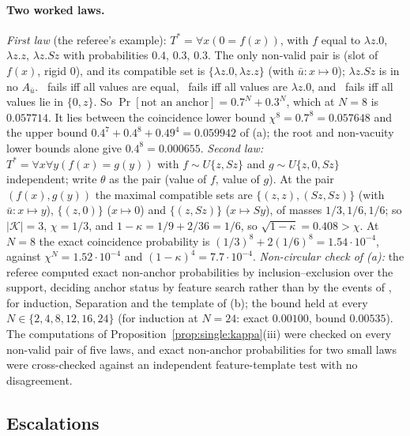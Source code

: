 \paragraph{Two worked laws.} \emph{First law} (the referee's example): $T^*=\forall x(0=f(x))$, with $f$ equal to $\lambda z.0$, $\lambda z.z$, $\lambda z.Sz$ with probabilities $0.4$, $0.3$, $0.3$. The only non-valid pair is (slot of $f(x)$, rigid $0$), and its compatible set is $\{\lambda z.0,\lambda z.z\}$ (with $\bar u:x\mapsto0$); $\lambda z.Sz$ is in no $A_{\bar u}$. \evRs\ fails iff all values are equal, \evN\ fails iff all values are $\lambda z.0$, and \evU\ fails iff all values lie in $\{0,z\}$. So $\Pr[\text{not an anchor}]=0.7^N+0.3^N$, which at $N=8$ is $0.057714$. It lies between the coincidence lower bound $\chi^8=0.7^8=0.057648$ and the upper bound $0.4^7+0.4^8+0.49^4=0.059942$ of (a); the root and non-vacuity lower bounds alone give $0.4^8=0.000655$. \emph{Second law:} $T^*=\forall x\forall y(f(x)=g(y))$ with $f\sim U\{z,Sz\}$ and $g\sim U\{z,0,Sz\}$ independent; write $\theta$ as the pair (value of $f$, value of $g$). At the pair $(f(x),g(y))$ the maximal compatible sets are $\{(z,z),(Sz,Sz)\}$ (with $\bar u:x\mapsto y$), $\{(z,0)\}$ ($x\mapsto0$) and $\{(z,Sz)\}$ ($x\mapsto Sy$), of masses $1/3,1/6,1/6$; so $|\mathcal K|=3$, $\chi=1/3$, and $1-\kappa=1/9+2/36=1/6$, so $\sqrt{1-\kappa}=0.408>\chi$. At $N=8$ the exact coincidence probability is $(1/3)^8+2(1/6)^8=1.54\cdot10^{-4}$, against $\chi^N=1.52\cdot10^{-4}$ and $(1-\kappa)^4=7.7\cdot10^{-4}$. \emph{Non-circular check of (a):} the referee computed exact non-anchor probabilities by inclusion--exclusion over the support, deciding anchor status by feature search rather than by the events of , for induction, Separation and the template of (b); the bound held at every $N\in\{2,4,8,12,16,24\}$ (for induction at $N=24$: exact $0.00100$, bound $0.00535$).  The computations of Proposition~\ref{prop:single:kappa}(iii) were checked on every non-valid pair of five laws, and exact non-anchor probabilities for two small laws were cross-checked against an independent feature-template test with no disagreement.

\subsection{Escalations}\label{app:single:esc}


